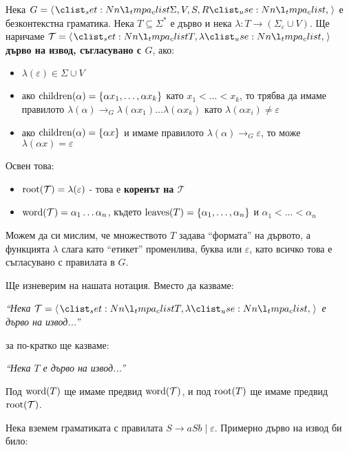 \begin{definition}
    Нека $G = \opair{\Sigma, V, S, R}$ е безконтекстна граматика.
    Нека $T \subseteq \Sigma^*$ е дърво и нека $\lambda : T \rightarrow (\Sigma_{\varepsilon} \cup V)$.
    Ще наричаме $\mathcal{T} = \opair{T, \lambda}$ \textbf{дърво на извод, съгласувано с $G$}, ако:
    \begin{itemize}
        \item $\lambda(\varepsilon) \in \Sigma \cup V$
        \item ако $\operatorname{children}(\alpha) = \{ \alpha x_1, \dots, \alpha x_k \}$ като $x_1 < \dots < x_k$, то трябва да имаме правилото $\lambda(\alpha) \rightarrow_G \lambda(\alpha x_1) \dots \lambda(\alpha x_k)$ като $\lambda(\alpha x_i) \neq \varepsilon$
        \item ако $\operatorname{children}(\alpha) = \{ \alpha x \}$ и имаме правилото $\lambda(\alpha) \rightarrow_G \varepsilon$, то може $\lambda(\alpha x) = \varepsilon$
    \end{itemize}
    Освен това:
    \begin{itemize}
        \item $\operatorname{root}(\mathcal{T}) = \lambda(\varepsilon)$ - това е \textbf{коренът на $\mathcal{T}$}
        \item $\operatorname{word}(\mathcal{T}) = \alpha_1 \dots \alpha_n$, където $\operatorname{leaves}(T) = \{ \alpha_1, \dots, \alpha_n \}$ и $\alpha_1 < \dots < \alpha_n$
    \end{itemize}
\end{definition}

Можем да си мислим, че множеството $T$ задава ``формата'' на дървото,
а функцията $\lambda$ слага като ``етикет'' променлива,
буква или $\varepsilon$, като всичко това е съгласувано с правилата в $G$.

\begin{remark}
    Ще изневерим на нашата нотация.
    Вместо да казваме:
    \begin{center}
        \textit{``Нека $\mathcal{T} = \opair{T, \lambda}$ е дърво на извод...''}
    \end{center}
    за по-кратко ще казваме:
    \begin{center}
        \textit{``Нека $T$ е дърво на извод...''}
    \end{center}
    Под $\operatorname{word}(T)$ ще имаме предвид $\operatorname{word}(\mathcal{T})$, и под $\operatorname{root}(T)$ ще имаме предвид $\operatorname{root}(\mathcal{T})$.
\end{remark}

Нека вземем граматиката с правилата $S \rightarrow aSb \mid \varepsilon$.
Примерно дърво на извод би било:

